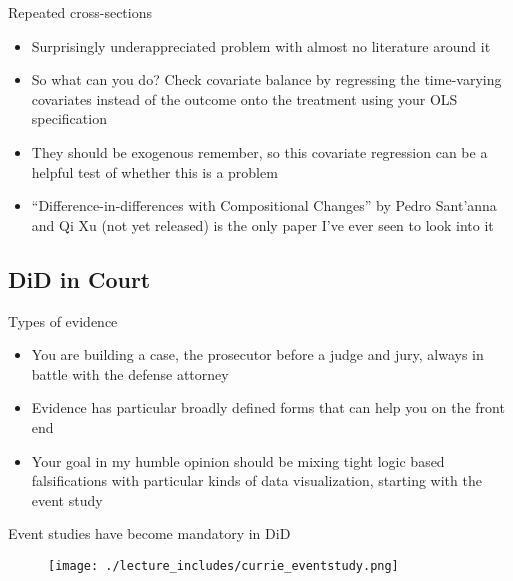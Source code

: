 \documentclass{beamer}
\begin{document}
\begin{frame}{Repeated cross-sections}

\begin{itemize}
\item Surprisingly underappreciated problem with almost no literature around it
\item So what can you do?  Check covariate balance by regressing the time-varying covariates instead of the outcome onto the treatment using your OLS specification
\item They should be exogenous remember, so this covariate regression can be a helpful test of whether this is a problem
\item ``Difference-in-differences with Compositional Changes'' by Pedro Sant'anna and Qi Xu (not yet released) is the only paper I've ever seen to look into it
\end{itemize}

\end{frame}


\subsection{DiD in Court}

\begin{frame}{Types of evidence}

\begin{itemize}
\item You are building a case, the prosecutor before a judge and jury, always in battle with the defense attorney
\item Evidence has particular broadly defined forms that can help you on the front end
\item Your goal in my humble opinion should be mixing tight logic based falsifications with particular kinds of data visualization, starting with the event study
\end{itemize}

\end{frame}


\begin{frame}{Event studies have become mandatory in DiD}

	\begin{figure}
	\texttt{[image: ./lecture\_includes/currie\_eventstudy.png]}
	\end{figure}

\end{frame}
\end{document}
